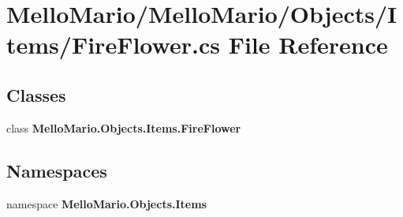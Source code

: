 \section{Mello\+Mario/\+Mello\+Mario/\+Objects/\+Items/\+Fire\+Flower.cs File Reference}
\label{FireFlower_8cs}
\subsection*{Classes}
\begin{DoxyCompactItemize}
\item 
class \textbf{ Mello\+Mario.\+Objects.\+Items.\+Fire\+Flower}
\end{DoxyCompactItemize}
\subsection*{Namespaces}
\begin{DoxyCompactItemize}
\item 
namespace \textbf{ Mello\+Mario.\+Objects.\+Items}
\end{DoxyCompactItemize}
